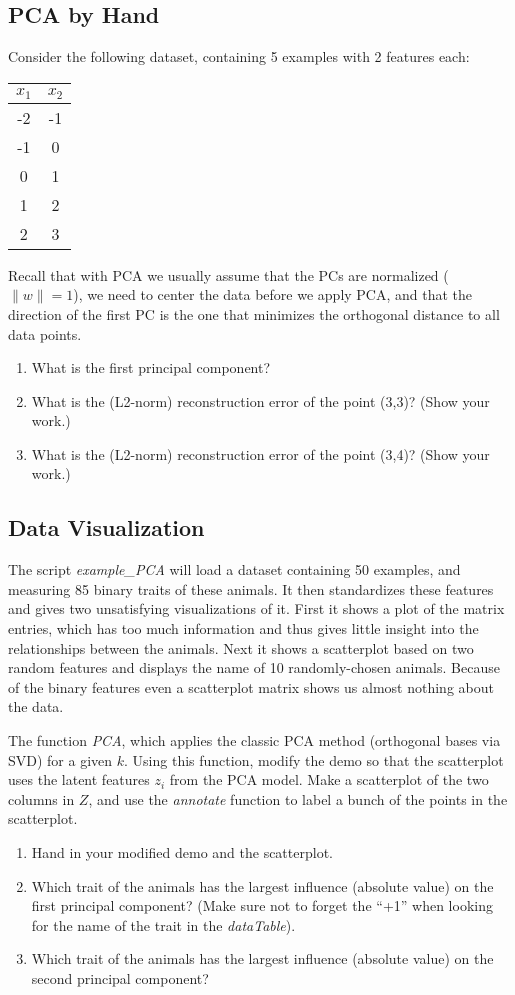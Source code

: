 \documentclass{article}
\def\blu#1{{\color{blu}#1}}
\def\norm#1{\|#1\|}
\def\enum#1{\begin{enumerate}#1\end{enumerate}}
\begin{document}
\subsection{PCA by Hand}

Consider the following dataset, containing 5 examples with 2 features each:
\begin{center}
\begin{tabular}{cc}
$x_1$ & $x_2$\\
\hline
-2 & -1\\
-1 & 0\\
0 & 1\\
1 & 2\\
2 & 3\\
\end{tabular}
\end{center}
Recall that with PCA we usually assume that the PCs are normalized ($\norm{w} = 1$), we need to center the data before we apply PCA, and that the direction of the first PC is the one that minimizes the orthogonal distance to all data points.
\blu{
\enum{
\item What is the first principal component?
\item What is the (L2-norm) reconstruction error of the point (3,3)? (Show your work.)
\item What is the (L2-norm) reconstruction error of the point (3,4)? (Show your work.)
}
}




\subsection{Data Visualization}

The script \emph{example\_PCA} will load a dataset containing 50 examples, and measuring 85 binary traits of these animals. It then standardizes these features and gives two unsatisfying visualizations of it. First it shows a plot of the matrix entries, which has too much information and thus gives little insight into the relationships between the animals. Next it shows a scatterplot based on two random features and displays the name of 10 randomly-chosen animals. Because of the binary features even a scatterplot matrix shows us almost nothing about the data.

The function \emph{PCA}, which applies the classic PCA method (orthogonal bases via SVD) for a given $k$. Using this function, modify the demo so that the scatterplot uses the latent features $z_i$ from the PCA model. Make a scatterplot of the two columns in $Z$, and use the \emph{annotate} function to label a bunch of the points in the scatterplot.
\blu{
\enum{
\item  Hand in your modified demo and the scatterplot.
\item Which trait of the animals has the largest influence (absolute value) on the first principal component? (Make sure not to forget the ``+1'' when looking for the name of the trait in the \emph{dataTable}).
\item Which trait of the animals has the largest influence (absolute value) on the second principal component?
}
}
\end{document}
